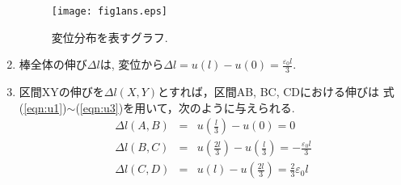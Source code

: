 \documentclass[10pt,a4j]{jarticle}
\begin{document}
\begin{enumerate}
\begin{figure}[h]
\begin{center}
	\texttt{[image: fig1ans.eps]} 
	\end{center}
	\caption{変位分布を表すグラフ.} 
	\label{fig:fig1}
\end{figure}
\item
	棒全体の伸び$\Delta l$は, 変位から$\Delta l=u(l)-u(0)=\frac{\varepsilon_0l}{3}$.
\item
	区間XYの伸びを$\Delta l(X,Y)$とすれば，区間AB, BC, CDにおける伸びは
	式(\ref{eqn:u1})$\sim$(\ref{eqn:u3})を用いて，次のように与えられる.
	\begin{eqnarray*}
		\Delta l(A,B) 
		&=& 
		u\left( \frac{l}{3}\right)-u(0)=0
		\\
		\Delta l(B,C)
		&=&
		u\left( \frac{2l}{3}\right)-u\left(\frac{l}{3}\right)
		=-\frac{\varepsilon_0l}{3}
		\\	
		\Delta l(C,D)
		&=&u(l)-u\left( \frac{2l}{3}\right)=\frac{2}{3}\varepsilon_0l
	\end{eqnarray*}	
\end{enumerate}
%
%
\end{document}
